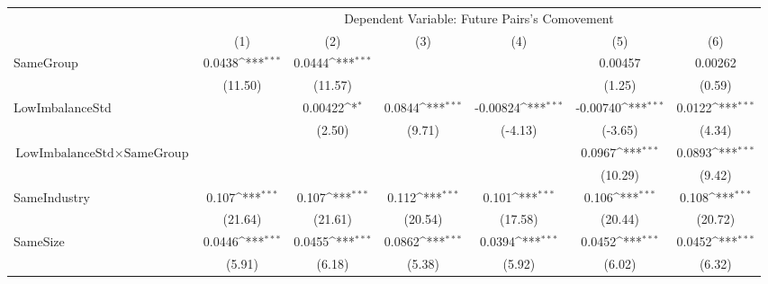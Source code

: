 {
\def\sym#1{\ifmmode^{#1}\else\(^{#1}\)\fi}
\begin{tabular}{l*{6}{c}}
\hline\hline
                    &\multicolumn{6}{c}{Dependent Variable:  Future Pairs's Comovement}                                                                 \\\cmidrule(lr){2-7}
                    &\multicolumn{1}{c}{(1)}         &\multicolumn{1}{c}{(2)}         &\multicolumn{1}{c}{(3)}         &\multicolumn{1}{c}{(4)}         &\multicolumn{1}{c}{(5)}         &\multicolumn{1}{c}{(6)}         \\
\hline
SameGroup           &      0.0438\sym{***}&      0.0444\sym{***}&                     &                     &     0.00457         &     0.00262         \\
                    &     (11.50)         &     (11.57)         &                     &                     &      (1.25)         &      (0.59)         \\
[1em]
LowImbalanceStd     &                     &     0.00422\sym{*}  &      0.0844\sym{***}&    -0.00824\sym{***}&    -0.00740\sym{***}&      0.0122\sym{***}\\
                    &                     &      (2.50)         &      (9.71)         &     (-4.13)         &     (-3.65)         &      (4.34)         \\
[1em]
 $ \text{LowImbalanceStd} \times {\text{SameGroup} } $ &                     &                     &                     &                     &      0.0967\sym{***}&      0.0893\sym{***}\\
                    &                     &                     &                     &                     &     (10.29)         &      (9.42)         \\
[1em]
SameIndustry        &       0.107\sym{***}&       0.107\sym{***}&       0.112\sym{***}&       0.101\sym{***}&       0.106\sym{***}&       0.108\sym{***}\\
                    &     (21.64)         &     (21.61)         &     (20.54)         &     (17.58)         &     (20.44)         &     (20.72)         \\
[1em]
SameSize            &      0.0446\sym{***}&      0.0455\sym{***}&      0.0862\sym{***}&      0.0394\sym{***}&      0.0452\sym{***}&      0.0452\sym{***}\\
                    &      (5.91)         &      (6.18)         &      (5.38)         &      (5.92)         &      (6.02)         &      (6.32)         \\

\end{tabular}}
